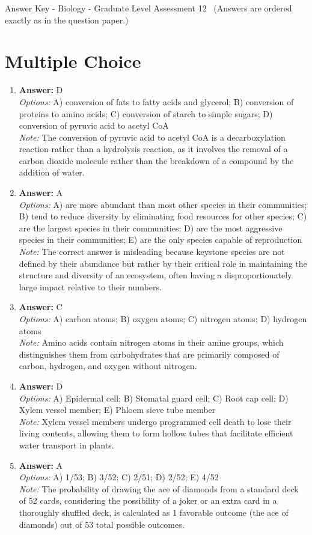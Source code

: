 \documentclass[12pt]{article}
\begin{document}
\begin{center}
Answer Key - Biology - Graduate Level Assessment 12 \
\small (Answers are ordered exactly as in the question paper.)
\end{center}

\section*{Multiple Choice}
\begin{enumerate}[label=\arabic*.]
\item \textbf{Answer:} D
\\ \textit{Options:} A) conversion of fats to fatty acids and glycerol; B) conversion of proteins to amino acids; C) conversion of starch to simple sugars; D) conversion of pyruvic acid to acetyl CoA
\\ \textit{Note:} The conversion of pyruvic acid to acetyl CoA is a decarboxylation reaction rather than a hydrolysis reaction, as it involves the removal of a carbon dioxide molecule rather than the breakdown of a compound by the addition of water.
\item \textbf{Answer:} A
\\ \textit{Options:} A) are more abundant than most other species in their communities; B) tend to reduce diversity by eliminating food resources for other species; C) are the largest species in their communities; D) are the most aggressive species in their communities; E) are the only species capable of reproduction
\\ \textit{Note:} The correct answer is misleading because keystone species are not defined by their abundance but rather by their critical role in maintaining the structure and diversity of an ecosystem, often having a disproportionately large impact relative to their numbers.
\item \textbf{Answer:} C
\\ \textit{Options:} A) carbon atoms; B) oxygen atoms; C) nitrogen atoms; D) hydrogen atoms
\\ \textit{Note:} Amino acids contain nitrogen atoms in their amine groups, which distinguishes them from carbohydrates that are primarily composed of carbon, hydrogen, and oxygen without nitrogen.
\item \textbf{Answer:} D
\\ \textit{Options:} A) Epidermal cell; B) Stomatal guard cell; C) Root cap cell; D) Xylem vessel member; E) Phloem sieve tube member
\\ \textit{Note:} Xylem vessel members undergo programmed cell death to lose their living contents, allowing them to form hollow tubes that facilitate efficient water transport in plants.
\item \textbf{Answer:} A
\\ \textit{Options:} A) 1/53; B) 3/52; C) 2/51; D) 2/52; E) 4/52
\\ \textit{Note:} The probability of drawing the ace of diamonds from a standard deck of 52 cards, considering the possibility of a joker or an extra card in a thoroughly shuffled deck, is calculated as 1 favorable outcome (the ace of diamonds) out of 53 total possible outcomes.
\end{enumerate}
\end{document}

